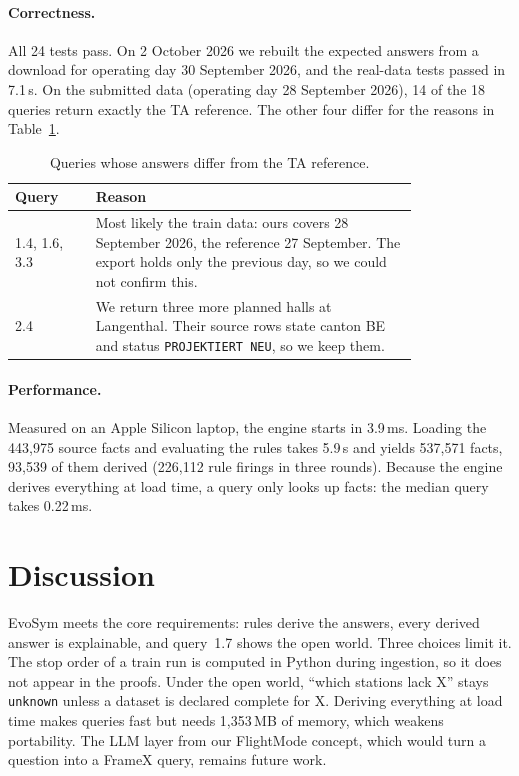 \documentclass[10pt]{article}
\begin{document}
\paragraph{Correctness.}
All 24 tests pass. On 2 October 2026 we rebuilt the expected answers from a download for operating day 30 September 2026, and the real-data tests passed in 7.1\,s. On the submitted data (operating day 28 September 2026), 14 of the 18 queries return exactly the TA reference. The other four differ for the reasons in Table~\ref{tab:reference}.

\begin{table}[h!]
\centering
\caption{Queries whose answers differ from the TA reference.}
\label{tab:reference}
\small
\begin{tabular}{@{}lp{0.8\linewidth}@{}}
\toprule
Query & Reason \\
\midrule
1.4, 1.6, 3.3 & Most likely the train data: ours covers 28 September 2026, the reference 27 September. The export holds only the previous day, so we could not confirm this. \\
2.4 & We return three more planned halls at Langenthal. Their source rows state canton BE and status \texttt{PROJEKTIERT NEU}, so we keep them. \\
\bottomrule
\end{tabular}
\end{table}

\paragraph{Performance.}
Measured on an Apple Silicon laptop, the engine starts in 3.9\,ms. Loading the 443,975 source facts and evaluating the rules takes 5.9\,s and yields 537,571 facts, 93,539 of them derived (226,112 rule firings in three rounds). Because the engine derives everything at load time, a query only looks up facts: the median query takes 0.22\,ms.

\section{Discussion}
\label{sec:discussion}

EvoSym meets the core requirements: rules derive the answers, every derived answer is explainable, and query~1.7 shows the open world. Three choices limit it. The stop order of a train run is computed in Python during ingestion, so it does not appear in the proofs. Under the open world, ``which stations lack X'' stays \texttt{unknown} unless a dataset is declared complete for X. Deriving everything at load time makes queries fast but needs 1,353\,MB of memory, which weakens portability. The LLM layer from our FlightMode concept, which would turn a question into a FrameX query, remains future work.
\end{document}
